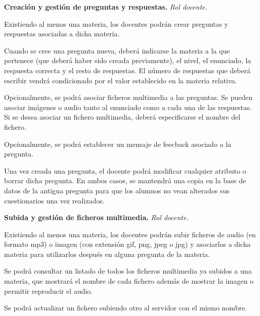 \begin{rf0}
	\item \textbf{Creación y gestión de preguntas y respuestas.} \textit{Rol docente.} 
		\begin{rf0*}
			\item Existiendo al menos una materia, los docentes podrán crear preguntas y respuestas asociadas a dicha materia.
			\item Cuando se cree una pregunta nueva, deberá indicarse la materia a la que pertenece (que deberá haber sido creada previamente), el nivel, el enunciado, la respuesta correcta y el resto de respuestas. El número de respuestas que deberá escribir vendrá condicionado por el valor establecido en la materia relativa.
			\item Opcionalmente, se podrá asociar ficheros multimedia a las preguntas. Se pueden asociar imágenes o audio tanto al enunciado como a cada una de las respuestas. Si se desea asociar un fichero multimedia, deberá especificarse el nombre del fichero.
			\item Opcionalmente, se podrá establecer un mensaje de feecback asociado a la pregunta.
			\item Una vez creada una pregunta, el docente podrá modificar cualquier atributo o borrar dicha pregunta. En ambos casos, se mantendrá una copia en la base de datos de la antigua pregunta para que los alumnos no vean alterados sus cuestionarios una vez realizados.
		\end{rf0*}
	
	\item \textbf{Subida y gestión de ficheros multimedia.} \textit{Rol docente.} 
		\begin{rf0*}
			\item Existiendo al menos una materia, los docentes podrán subir ficheros de audio (en formato mp3) o imagen (con extensión gif, png, jpeg o jpg) y asociarlos a dicha materia para utilizarlos después en alguna pregunta de la materia.
			\item Se podrá consultar un listado de todos los ficheros multimedia ya subidos a una materia, que mostrará el nombre de cada fichero además de mostrar la imagen o permitir reproducir el audio.
			\item Se podrá actualizar un fichero subiendo otro al servidor con el mismo nombre.
		\end{rf0*}


\end{rf0}
